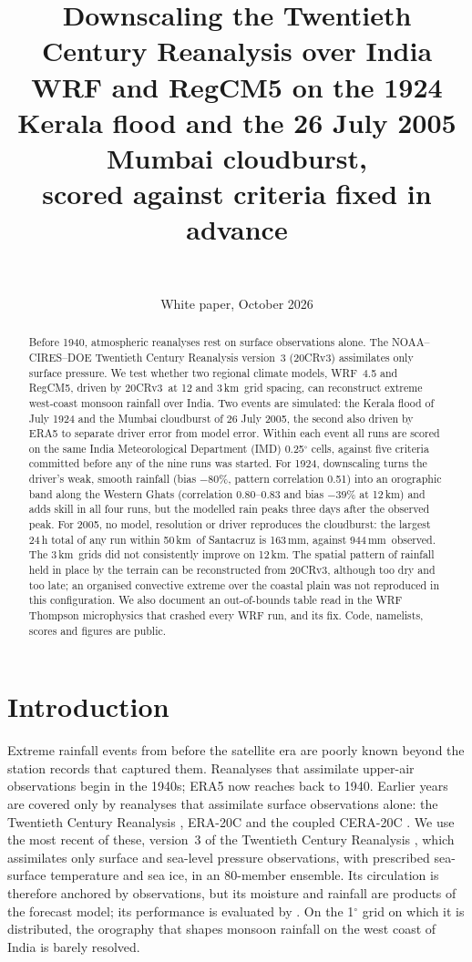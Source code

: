 \documentclass[11pt,a4paper]{article}
\title{\textbf{Downscaling the Twentieth Century Reanalysis over India}\\[4pt]
\large WRF and RegCM5 on the 1924 Kerala flood and the 26 July 2005 Mumbai cloudburst,\\
scored against criteria fixed in advance}
\author{\paperauthor\\[2pt]\small\paperaffil}
\date{White paper, October 2026}
\newcommand{\twcr}{20CRv3}
\newcommand{\km}{\,km}
\newcommand{\mm}{\,mm}
\begin{document}
\maketitle

\begin{abstract}
\noindent Before 1940, atmospheric reanalyses rest on surface observations alone. The
NOAA--CIRES--DOE Twentieth Century Reanalysis version~3 (\twcr) assimilates only surface
pressure.
We test whether two regional climate models, WRF~4.5 and RegCM5, driven by \twcr\ at 12
and 3\km\ grid spacing, can reconstruct extreme west-coast monsoon rainfall over India.
Two events are simulated: the Kerala flood of July 1924 and the Mumbai cloudburst of
26 July 2005, the second also driven by ERA5 to separate driver error from model error.
Within each event all runs are scored on the same India Meteorological Department (IMD)
0.25$^\circ$ cells, against five criteria committed before any of the nine runs was started.
For 1924, downscaling turns the driver's weak, smooth rainfall (bias $-80$\%, pattern
correlation 0.51) into an orographic band along the Western Ghats (correlation 0.80--0.83
and bias $-39$\% at 12\km) and adds skill in all four runs, but the modelled rain peaks
three days after the observed peak.
For 2005, no model, resolution or driver reproduces the cloudburst: the largest 24\,h total
of any run within 50\km\ of Santacruz is 163\mm, against 944\mm\ observed.
The 3\km\ grids did not consistently improve on 12\km.
The spatial pattern of rainfall held in place by the terrain can be reconstructed from
\twcr, although too dry and too late; an organised convective extreme over the coastal plain
was not reproduced in this configuration. We also document an out-of-bounds table read in
the WRF Thompson microphysics that crashed every WRF run, and its fix. Code, namelists, scores and figures are public.
\end{abstract}

\section{Introduction}

Extreme rainfall events from before the satellite era are poorly known beyond the
station records that captured them. Reanalyses that assimilate upper-air observations
begin in the 1940s; ERA5 now reaches back to 1940. Earlier years are covered only by
reanalyses that assimilate surface observations alone: the Twentieth Century Reanalysis
\citep{compo2011}, ERA-20C \citep{poli2016} and the coupled CERA-20C
\citep{laloyaux2018}. We use the most recent of these, version~3 of the Twentieth Century
Reanalysis \citep[\twcr;][]{slivinski2019}, which assimilates only surface and sea-level
pressure observations, with prescribed sea-surface
temperature and sea ice, in an 80-member ensemble. Its circulation is therefore anchored by
observations, but its moisture and rainfall are products of the forecast model; its
performance is evaluated by \citet{slivinski2021}. On the 1$^\circ$ grid on which it is
distributed, the orography that shapes monsoon rainfall on the west coast of India is barely
resolved.
\end{document}
